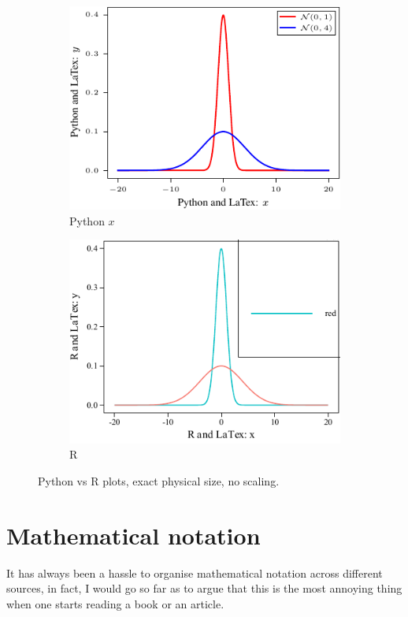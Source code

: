 \documentclass[aos,preprint]{imsart}
\begin{document}
\begin{figure}[htb]
    \centering
    \begin{subfigure}[t]{2.8in}
        \includegraphics{scatterplot-python.pdf}
        \caption{Python $x$}
    \end{subfigure}\hfill
    \begin{subfigure}[t]{2.8in}
        \includegraphics{scatterplot-R.pdf}
        \caption{R}
    \end{subfigure}

    \caption{Python vs R plots, exact physical size, no scaling.}
\end{figure}

\newpage

\section{Mathematical notation}

It has always been a hassle to organise mathematical notation across different sources,
in fact, I would go so far as to argue that this is the most annoying thing
when one starts reading a book or an article.
\end{document}
